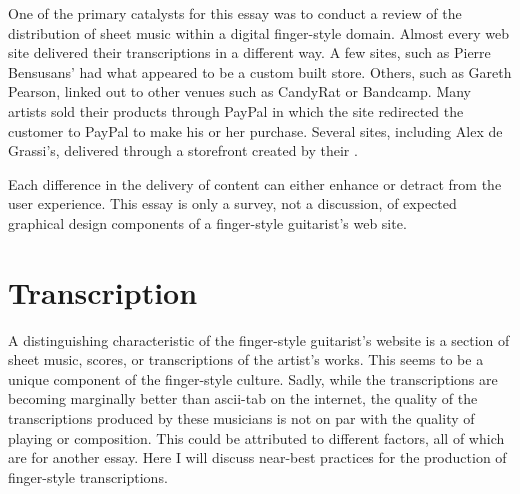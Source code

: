 \documentclass[unicode,hyperfootnotes=false,xetex,colorlinks=true,nofonts,nobib]{tufte-handout}
\newcommand{\textls}[2][5]{%
    \begingroup\addfontfeatures{LetterSpace=#1}#2\endgroup
  }
\renewcommand{\smallcapsspacing}[1]{\textls[10]{#1}}
\renewcommand{\textsc}[1]{\smallcapsspacing{\textsmallcaps{#1}}}
\begin{document}
One of the primary catalysts for this essay was to conduct a review of the distribution of sheet music within a digital finger-style domain. Almost every web site delivered their transcriptions in a different way. A few sites, such as Pierre Bensusans' had what appeared to be a custom built store. Others, such as Gareth Pearson, linked out to other venues such as CandyRat or Bandcamp. Many artists sold their products through PayPal in which the site redirected the customer to PayPal to make his or her purchase. Several sites, including Alex de Grassi's, delivered through a storefront created by their \textsc{cms}.

Each difference in the delivery of content can either enhance or detract from the user experience. This essay is only a survey, not a discussion, of expected graphical design components of a finger-style guitarist's web site.
\section{Transcription}
A distinguishing characteristic of the finger-style guitarist's website is a section of sheet music, scores, or transcriptions of the artist's works. This seems to be a unique component of the finger-style culture. Sadly, while the transcriptions are becoming marginally better than ascii-tab on the internet, the quality of the transcriptions produced by these musicians is not on par with the quality of playing or composition. This could be attributed to different factors, all of which are for another essay. Here I will discuss near-best practices for the production of finger-style transcriptions.
\end{document}
